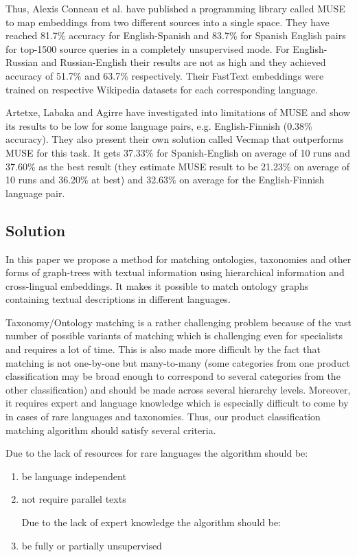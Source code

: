 \documentclass[11pt,a4paper]{article}
\begin{document}
Thus, Alexis Conneau et al. \cite{muse} have published a programming library called MUSE to map embeddings from two different sources into a single space. They have reached 81.7\% accuracy for English-Spanish and 83.7\% for Spanish English pairs for top-1500 source queries in a completely unsupervised mode. For English-Russian and Russian-English their results are not as high and they achieved accuracy of 51.7\% and 63.7\% respectively. Their FastText embeddings were trained on respective Wikipedia datasets for each corresponding language. 

Artetxe, Labaka and Agirre have investigated into limitations of MUSE and show its results to be low for some language pairs, e.g. English-Finnish (0.38\% accuracy). They also present their own solution called Vecmap \cite{vecmap} that outperforms MUSE for this task. It gets 37.33\% for Spanish-English on average of 10 runs and 37.60\% as the best result (they estimate MUSE result to be 21.23\% on average of 10 runs and 36.20\% at best) and 32.63\% on average for the English-Finnish language pair.

\subsection{Solution}
In this paper we propose a method for matching ontologies, taxonomies and other forms of graph-trees with textual information using hierarchical information and cross-lingual embeddings. It makes it possible to match ontology graphs containing textual descriptions in different languages.

Taxonomy/Ontology matching is a rather challenging problem because of the vast number of possible variants of matching which is challenging even for specialists and requires a lot of time. This is also made more difficult by the fact that matching is not one-by-one but many-to-many (some categories from one product classification may be broad enough to correspond to several categories from the other classification) and should be made across several hierarchy levels. Moreover, it requires expert and language knowledge which is especially difficult to come by in cases of rare languages and taxonomies. Thus, our product classification matching algorithm should satisfy several criteria.

Due to the lack of resources for rare languages	the algorithm should be:
\begin{enumerate}
	
	\item be language independent
	
	\item not require parallel texts
	
	
	Due to the lack of expert knowledge the algorithm should be:
	
	\item be fully or partially unsupervised
\end{enumerate}
\end{document}
